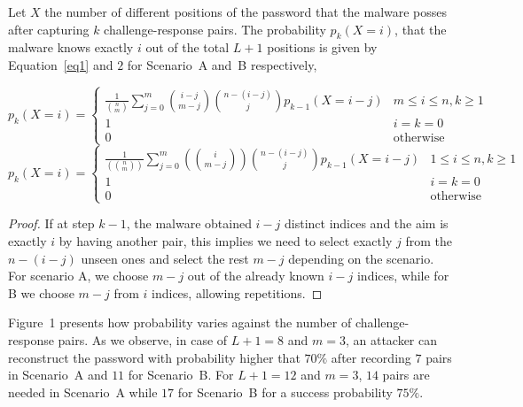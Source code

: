 \documentclass{llncs}
\begin{document}
\begin{theorem} \label{theorem1}

Let $X$ the number of different positions of the password that the malware
posses after capturing $k$ challenge-response pairs.
The probability \linebreak $p_k(X=i)$, that the malware knows
exactly $i$ out of the total $L+1$ positions is given by Equation~\ref{eq1} and $2$ for
Scenario~A and~B respectively,

\begin{equation}\label{eq1}
 p_k(X=i)= \begin{cases}
\frac{1}{\binom{n}{m}}\sum_{j=0}^{m}\binom{i-j}{m-j}\binom{n-(i-j)}{j}p_{k-1}(X=i-j) &\text{$m \leq i \leq n, k \geq 1$}\\
1 &\text{$i=k=0$} \\
0 & \text{otherwise}
\end{cases}
\end{equation}
\begin{equation}\label{eq2}
 p_k(X=i)= \begin{cases}
\frac{1}{\left(\!\!{n\choose m}\!\!\right)}\sum_{j=0}^{m}\left(\!\!{i\choose m-j}\!\!\right)\binom{n-(i-j)}{j}p_{k-1}(X=i-j) &\text{$1 \leq i \leq n, k \geq 1$}\\
1 &\text{$i=k=0$} \\
0 & \text{otherwise}
\end{cases}
\end{equation}
\end{theorem}

\begin{proof}
If at step $k-1$, the
malware obtained $i-j$ distinct indices and the aim is exactly $i$ by having
another pair, this implies we need to select exactly $j$ from the $n-(i-j)$
unseen ones and select the rest $m-j$ depending on the scenario.
For scenario A, we choose $m-j$ out of the already known $i-j$ indices,
while for B we choose $m-j$ from $i$ indices, allowing repetitions.
\end{proof}

Figure~1 presents how probability varies
against the number of challenge-response pairs. As we
observe, in case of $L+1=8$ and $m=3$, an attacker
can reconstruct the password with probability higher that $70\%$
after recording $7$ pairs in Scenario~A and $11$ for Scenario~B. For $L+1=12$
and $m=3$, $14$ pairs are needed in Scenario~A while $17$ for
Scenario~B for a success
probability $75\%$.
\end{document}
